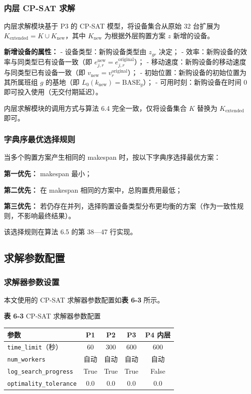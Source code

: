 \documentclass[UTF8,a4paper,12pt]{ctexart}
\begin{document}
\subsubsection{内层 CP-SAT 求解}
内层求解模块基于 P3 的 CP-SAT 模型，将设备集合从原始 32 台扩展为 $K_{\text{extended}} = K \cup K_{\text{new}}$，其中 $K_{\text{new}}$ 为根据外层购置方案 $z$ 新增的设备。

\textbf{新增设备的属性：}
- 设备类型：新购设备类型由 $z_{gr}$ 决定；
- 效率：新购设备的效率与同类型已有设备一致（即 $e_{j,r}^{\text{new}} = e_{j,r}^{\text{original}}$）；
- 移动速度：新购设备的移动速度与同类型已有设备一致（即 $v_{\text{new}} = v_{r}^{\text{original}}$）；
- 初始位置：新购设备的初始位置为其所属班组 $g$ 的基地（即 $L_0(k_{\text{new}}) = \text{BASE}_g$）；
- 可用时刻：新购设备在时间 0 即可投入使用（无交付期延迟）。

内层求解模块的调用方式与算法 6.4 完全一致，仅将设备集合 $K$ 替换为 $K_{\text{extended}}$ 即可。

\subsubsection{字典序最优选择规则}
当多个购置方案产生相同的 makespan 时，按以下字典序选择最优方案：

\textbf{第一优先：} makespan 最小；

\textbf{第二优先：} 在 makespan 相同的方案中，总购置费用最低；

\textbf{第三优先：} 若仍存在并列，选择购置设备类型分布更均衡的方案（作为一致性规则，不影响最终结果）。

该选择规则在算法 6.5 的第 38—47 行实现。

\subsection{求解参数配置}
\subsubsection{求解器参数设置}
本文使用的 CP-SAT 求解器参数配置如\textbf{表 6-3} 所示。

\begin{center}
\textbf{表 6-3} CP-SAT 求解器参数配置
\begin{tabular}{lcccc}
\toprule
参数 & P1 & P2 & P3 & P4 内层 \\
\midrule
\texttt{time\_limit}（秒） & 60 & 300 & 600 & 600 \\
\texttt{num\_workers} & 自动 & 自动 & 自动 & 自动 \\
\texttt{log\_search\_progress} & True & True & True & False \\
\texttt{optimality\_tolerance} & 0.0 & 0.0 & 0.0 & 0.0 \\
\bottomrule
\end{tabular}
\end{center}
\end{document}
